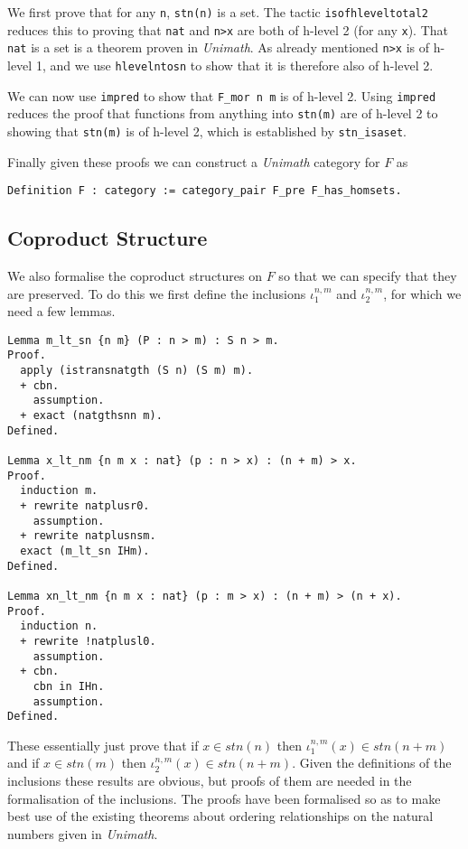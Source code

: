 We first prove that for any \verb|n|, \verb|stn(n)| is a set. The tactic
\verb|isofhleveltotal2| reduces this to proving that \verb|nat| and \verb|n>x|
are both of h-level 2 (for any \verb|x|). That \verb|nat| is a set is a theorem
proven in \textit{Unimath}. As already mentioned \verb|n>x| is of h-level 1, and
we use \verb|hlevelntosn| to show that it is therefore also of h-level 2.

We can now use \verb|impred| to show that \verb|F_mor n m| is of h-level 2.
Using \verb|impred| reduces the proof that functions from anything into
\verb|stn(m)| are of h-level 2 to showing that \verb|stn(m)| is of h-level 2,
which is established by \verb|stn_isaset|.

Finally given these proofs we can construct a \textit{Unimath} category for $F$
as
\begin{lstlisting}
Definition F : category := category_pair F_pre F_has_homsets.
\end{lstlisting}

\subsection{Coproduct Structure}
We also formalise the coproduct structures on $F$ so that we can specify that
they are preserved. To do this we first define the inclusions $\iota_1^{n,m}$
and $\iota_2^{n,m}$, for which we need a few lemmas.

\begin{lstlisting}
Lemma m_lt_sn {n m} (P : n > m) : S n > m.
Proof.
  apply (istransnatgth (S n) (S m) m).
  + cbn.
    assumption.
  + exact (natgthsnn m).
Defined.

Lemma x_lt_nm {n m x : nat} (p : n > x) : (n + m) > x.
Proof.
  induction m.
  + rewrite natplusr0.
    assumption.
  + rewrite natplusnsm.
  exact (m_lt_sn IHm).
Defined.

Lemma xn_lt_nm {n m x : nat} (p : m > x) : (n + m) > (n + x).
Proof.
  induction n.
  + rewrite !natplusl0.
    assumption.
  + cbn.
    cbn in IHn.
    assumption.
Defined.
\end{lstlisting}

These essentially just prove that if $x\in stn(n)$ then $\iota_1^{n,m}(x) \in
stn(n+m)$ and if $x\in stn(m)$ then $\iota_2^{n,m}(x)\in stn(n+m)$. Given the
definitions of the inclusions these results are obvious, but proofs of them are
needed in the formalisation of the inclusions. The proofs have been formalised
so as to make best use of the existing theorems about ordering relationships on
the natural numbers given in \textit{Unimath}.

